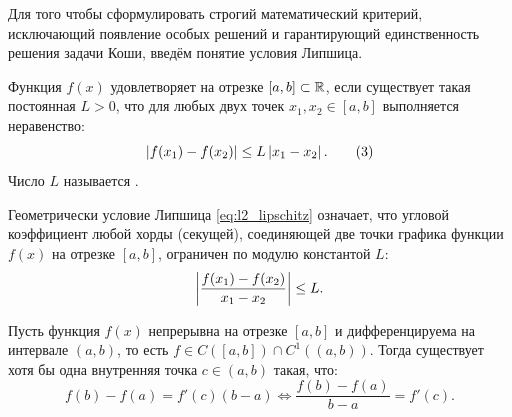 Для того чтобы сформулировать строгий математический критерий, исключающий
появление особых решений и гарантирующий единственность решения задачи Коши,
введём понятие условия Липшица.

\begin{definition}
    Функция $f(x)$ удовлетворяет  на отрезке
    $[a, b] \subset \mathbb{R}$, если существует такая постоянная $L > 0$, что для
    любых двух точек $x_1, x_2 \in [a, b]$ выполняется неравенство:
    \begin{equation} \label{eq:l2_lipschitz}
        \left| f(x_1) - f(x_2) \right| \le L \left| x_1 - x_2 \right|. \tag{3}
    \end{equation}
    Число $L$ называется .
\end{definition}

Геометрически условие Липшица \eqref{eq:l2_lipschitz} означает, что угловой
коэффициент любой хорды (секущей), соединяющей две точки графика функции
$f(x)$ на отрезке $[a, b]$, ограничен по модулю константой $L$:
\[
    \left| \frac{f(x_1) - f(x_2)}{x_1 - x_2} \right| \le L.
\]

\begin{theorem}
    Пусть функция $f(x)$ непрерывна на отрезке $[a, b]$ и дифференцируема на
    интервале $(a, b)$, то есть $f \in C([a, b]) \cap C^1((a, b))$. Тогда
    существует хотя бы одна внутренняя точка $c \in (a, b)$ такая, что:
    \begin{equation} \label{eq:l2_lagrange}
        f(b) - f(a) = f'(c)(b - a) \iff \frac{f(b) - f(a)}{b - a} = f'(c).
        \tag{4}
    \end{equation}
\end{theorem}

